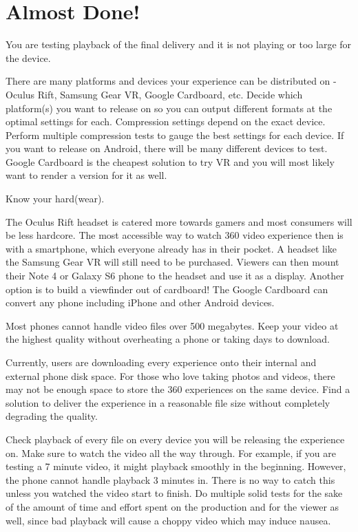 \chapter{Almost Done!}
\pagecolor{white}
\label{chap:57}
\begin{fullwidth}

\problem

{\large You are testing playback of the final delivery and it is not playing or too large for the device. \par}

There are many platforms and devices your experience can be distributed on - Oculus Rift, Samsung Gear VR, Google Cardboard, etc. Decide which platform(s) you want to release on so you can output different formats at the optimal settings for each. Compression settings depend on the exact device. Perform multiple compression tests to gauge the best settings for each device. If you want to release on Android, there will be many different devices to test. Google Cardboard is the cheapest solution to try VR and you will most likely want to render a version for it as well.

\solutions

{\large Know your hard(wear). \par}

The Oculus Rift headset is catered more towards gamers and most consumers will be less hardcore. The most accessible way to watch 360 video experience then is with a smartphone, which everyone already has in their pocket. A headset like the Samsung Gear VR will still need to be purchased. Viewers can then mount their Note 4 or Galaxy S6 phone to the headset and use it as a display. Another option is to build a viewfinder out of cardboard! The Google Cardboard can convert any phone including iPhone and other Android devices.
 
Most phones cannot handle video files over 500 megabytes. Keep your video at the highest quality without overheating a phone or taking days to download. 

Currently, users are downloading every experience onto their internal and external phone disk space. For those who love taking photos and videos, there may not be enough space to store the 360 experiences on the same device. Find a solution to deliver the experience in a reasonable file size without completely degrading the quality.

Check playback of every file on every device you will be releasing the experience on. Make sure to watch the video all the way through. For example, if you are testing a 7 minute video, it might playback smoothly in the beginning. However, the phone cannot handle playback 3 minutes in. There is no way to catch this unless you watched the video start to finish. Do multiple solid tests for the sake of the amount of time and effort spent on the production and for the viewer as well, since bad playback will cause a choppy video which may induce nausea. 


\end{fullwidth}
